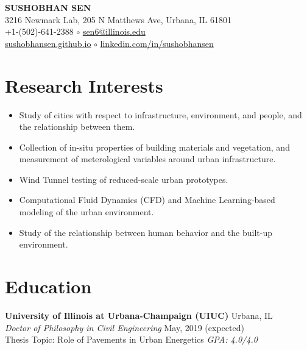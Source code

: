 \documentclass[12pt]{article}
\begin{document}
 \sloppy %
\begin{center}
{\large \uppercase{\textbf{Sushobhan Sen}}} \\
3216 Newmark Lab, 205 N Matthews Ave, Urbana, IL 61801 \\
+1-(502)-641-2388 $\circ$ \href{mailto:sen6@illinois.edu}{sen6@illinois.edu} \\
\href{http://sushobhansen.github.io/}{sushobhansen.github.io} $\circ$ \href{http://linkedin.com/in/sushobhansen}{linkedin.com/in/sushobhansen}
\end{center} 

\hfill \break %
\section*{Research Interests}
\begin{itemize}
	\item Study of cities with respect to infrastructure, environment, and people, and the relationship between them.
	\item Collection of in-situ properties of building materials and vegetation, and measurement of meterological variables around urban infrastructure. 
	\item Wind Tunnel testing of reduced-scale urban prototypes.
	\item Computational Fluid Dynamics (CFD) and Machine Learning-based modeling of the urban environment. 
	\item Study of the relationship between human behavior and the built-up environment.
\end{itemize}
 

\section*{Education}
\textbf{University of Illinois at Urbana-Champaign (UIUC)} \hfill Urbana, IL\\
\textit{Doctor of Philosophy in Civil Engineering} \hfill May, 2019 (expected)\\
Thesis Topic: Role of Pavements in Urban Energetics \hfill \textit{GPA: 4.0/4.0} \\
\end{document}
